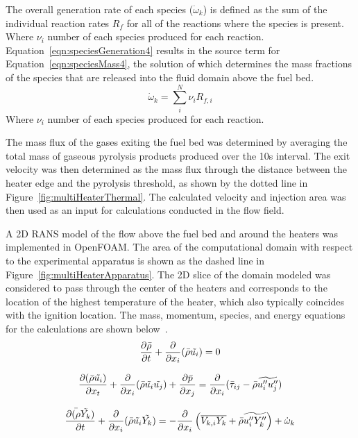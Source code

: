   The overall generation rate of each species ($\dot{\omega}_k$) is defined as the sum of the individual reaction rates $R_f$ for all of the reactions where the species is present. Where $\nu_i$ number of each species produced for each reaction. Equation~\ref{eqn:speciesGeneration4} results in the source term for Equation~\ref{eqn:speciesMass4}, the solution of which determines the mass fractions of the species that are released into the fluid domain above the fuel bed.
        \begin{equation}
            \dot{\omega}_k = \sum_i^N \nu_i R_{f, i}
            \label{eqn:speciesGeneration4}
        \end{equation}
    Where $\nu_i$ number of each species produced for each reaction.
    
    The mass flux of the gases exiting the fuel bed was determined by averaging the total mass of gaseous pyrolysis products produced over the 10\si{\second} interval. The exit velocity was then determined as the mass flux through the distance between the heater edge and the pyrolysis threshold, as shown by the dotted line in Figure~\ref{fig:multiHeaterThermal}. The calculated velocity and injection area was then used as an input for calculations conducted in the flow field. 
    
    A 2D RANS model of the flow above the fuel bed and around the heaters was implemented in OpenFOAM. The area of the computational domain with respect to the experimental apparatus is shown as the dashed line in Figure~\ref{fig:multiHeaterApparatus}. The 2D slice of the domain modeled was considered to pass through the center of the heaters and corresponds to the location of the highest temperature of the heater, which also typically coincides with the ignition location. The  mass, momentum, species, and energy equations for the calculations are shown below~\cite{Versteeg2007AnMethod}.
            \begin{equation}
                \pder[\bar{\rho}]{t} + \pder{x_i} (\bar{\rho} \tilde{u_i}) = 0
            \end{equation}
            
            \begin{equation}
                \pder[(\bar{\rho} \tilde{u_i})]{x_t} + \pder{x_i} (\bar{\rho} \tilde{u_i} \tilde{u_j}) + \pder[\bar{p}]{x_j} = \pder{x_i} (\bar{\tau}_{ij} -\bar{\rho}\widetilde{u''_i u''_j})
            \end{equation}
            
            \begin{equation}
                \pder[\bar{(\rho} \tilde{Y_k})]{t} + \pder{x_i} (\bar{\rho} \tilde{u_i} \tilde{Y_k}) = - \pder{x_i} \left(\overline{V_{k,i}Y_{k}} + \bar{\rho} \widetilde{u''_{i} Y''_{k}}\right) +  \dot{\omega}_k
            \end{equation}

